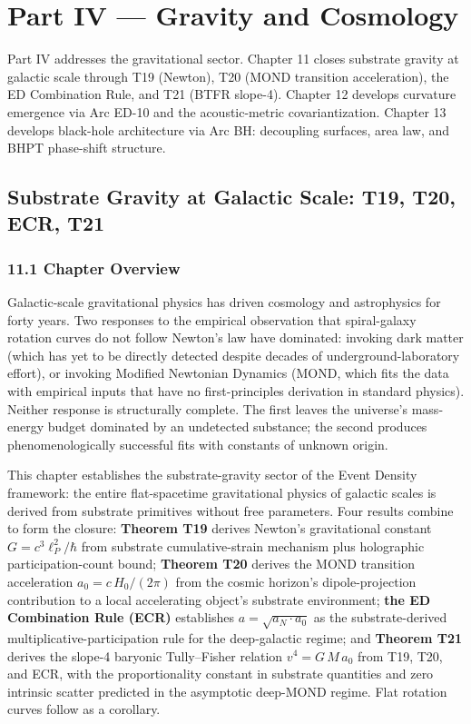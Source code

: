 \documentclass[11pt]{book}
\begin{document}
\newpage


\part{Part IV — Gravity and Cosmology}

Part IV addresses the gravitational sector. Chapter 11 closes substrate gravity at galactic scale through T19 (Newton), T20 (MOND transition acceleration), the ED Combination Rule, and T21 (BTFR slope-4). Chapter 12 develops curvature emergence via Arc ED-10 and the acoustic-metric covariantization. Chapter 13 develops black-hole architecture via Arc BH: decoupling surfaces, area law, and BHPT phase-shift structure.

\newpage


\chapter{Substrate Gravity at Galactic Scale: T19, T20, ECR, T21}
\label{chap:11}

\section{11.1 Chapter Overview}

Galactic-scale gravitational physics has driven cosmology and astrophysics for forty years. Two responses to the empirical observation that spiral-galaxy rotation curves do not follow Newton's law have dominated: invoking dark matter (which has yet to be directly detected despite decades of underground-laboratory effort), or invoking Modified Newtonian Dynamics (MOND, which fits the data with empirical inputs that have no first-principles derivation in standard physics). Neither response is structurally complete. The first leaves the universe's mass-energy budget dominated by an undetected substance; the second produces phenomenologically successful fits with constants of unknown origin.

This chapter establishes the substrate-gravity sector of the Event Density framework: the entire flat-spacetime gravitational physics of galactic scales is derived from substrate primitives without free parameters. Four results combine to form the closure: \textbf{Theorem T19} derives Newton's gravitational constant $G = c^3\ell_P^2/\hbar$ from substrate cumulative-strain mechanism plus holographic participation-count bound; \textbf{Theorem T20} derives the MOND transition acceleration $a_0 = c\,H_0/(2\pi)$ from the cosmic horizon's dipole-projection contribution to a local accelerating object's substrate environment; \textbf{the ED Combination Rule (ECR)} establishes $a = \sqrt{a_N \cdot a_0}$ as the substrate-derived multiplicative-participation rule for the deep-galactic regime; and \textbf{Theorem T21} derives the slope-4 baryonic Tully–Fisher relation $v^4 = G\,M\,a_0$ from T19, T20, and ECR, with the proportionality constant in substrate quantities and zero intrinsic scatter predicted in the asymptotic deep-MOND regime. Flat rotation curves follow as a corollary.
\end{document}
